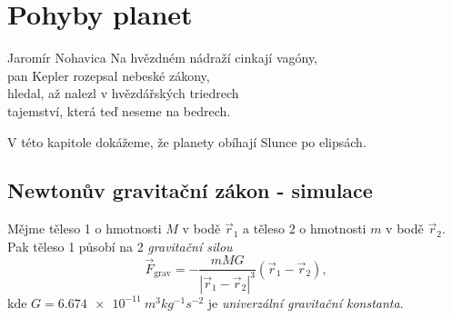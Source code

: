 \chapter{Pohyby planet}
\begin{chapquote}{Jaromír Nohavica}
  Na hvězdném nádraží cinkají vagóny, \\
   pan Kepler rozepsal nebeské zákony, \\
   hledal, až nalezl v hvězdářských triedrech \\
   tajemství, která teď neseme na bedrech.
\end{chapquote}
V této kapitole dokážeme, že planety obíhají Slunce po elipsách.

\section{Newtonův gravitační zákon - simulace}
Mějme těleso 1 o hmotnosti $M$ v bodě $\vec{r}_1$ a těleso 2 o hmotnosti $m$ v bodě $\vec{r}_2$. Pak těleso 1 působí na 2 \emph{gravitační silou}
\begin{equation*}
	\vec{F}_{\text{grav}}=-\frac{mMG}{|\vec{r}_1-\vec{r}_2|^3}(\vec{r}_1-\vec{r}_2),
\end{equation*}
kde $G=\SI{6.674 e-11}{m^3kg^{-1}s^{-2}}$ je \emph{univerzální gravitační konstanta}.

